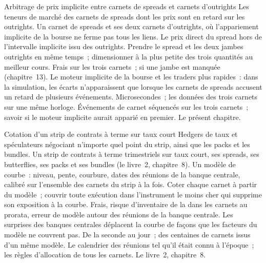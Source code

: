 \begin{strategyfile}{Arbitrage de prix implicite entre carnets de spreads et carnets d'outrights}\label{strat:hf:futures-market-making:implied}
 Les teneurs de marché des carnets de spreads dont les prix sont en retard sur les outrights.
 Un carnet de spreads et ses deux carnets d'outrights, où l'appariement implicite de la bourse ne ferme pas tous les liens.
 Le prix direct du spread hors de l'intervalle implicite issu des outrights.
 Prendre le spread et les deux jambes outrights en même temps~; dimensionner à la plus petite des trois quantités au meilleur cours.
 Frais sur les trois carnets~;  si une jambe est manquée (chapitre~13).
 Le moteur implicite de la bourse et les traders plus rapides~: dans la simulation, les écarts n'apparaissent que lorsque les carnets de spreads accusent un retard de plusieurs
événements.
 Microsecondes~; les données des trois carnets sur une même horloge.
 Événements de carnet séquencés sur les trois carnets~; savoir si le moteur implicite aurait apparié en premier.
 Le présent chapitre.
\end{strategyfile}

\begin{strategyfile}{Cotation d'un strip de contrats à terme sur taux court}\label{strat:hf:futures-market-making:strip}
 Hedgers de taux et spéculateurs négociant n'importe quel point du strip, ainsi que les packs et les bundles.
 Un strip de contrats à terme trimestriels sur taux court, ses spreads, ses butterflies, ses packs et ses bundles (le livre~2, chapitre~8).
 Un modèle de courbe~: niveau, pente, courbure, dates des réunions de la banque centrale, calibré sur l'ensemble des carnets du strip à la fois.
 Coter chaque carnet à partir du modèle~; couvrir toute exécution dans l'instrument le moins cher qui supprime son exposition à la courbe.
 Frais, risque d'inventaire de la  dans les carnets au prorata, erreur de modèle autour des réunions de la banque centrale.
 Les surprises des banques centrales déplacent la courbe de façons que les facteurs du modèle ne couvrent pas.
 De la seconde au jour~; des centaines de carnets issus d'un même modèle.
 Le calendrier des réunions tel qu'il était connu à l'époque~; les règles d'allocation de tous les carnets.
 Le livre~2, chapitre~8.
\end{strategyfile}

